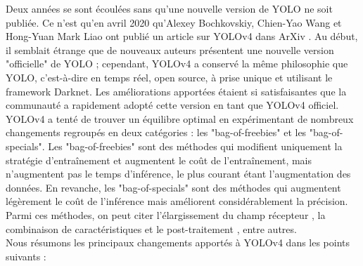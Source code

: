 \documentclass{article}
\begin{document}
Deux années se sont écoulées sans qu'une nouvelle version de YOLO ne soit publiée. Ce n'est qu'en avril 2020 qu'Alexey Bochkovskiy, Chien-Yao Wang et Hong-Yuan Mark Liao ont publié un article sur YOLOv4 dans ArXiv \cite{50}. Au début, il semblait étrange que de nouveaux auteurs présentent une nouvelle version "officielle" de YOLO ; cependant, YOLOv4 a conservé la même philosophie que YOLO, c'est-à-dire en temps réel, open source, à prise unique et utilisant le framework Darknet. Les améliorations apportées étaient si satisfaisantes que la communauté a rapidement adopté cette version en tant que YOLOv4 officiel.
\vspace{.2cm}\\
YOLOv4 a tenté de trouver un équilibre optimal en expérimentant de nombreux changements regroupés en deux catégories : les "bag-of-freebies" et les "bag-of-specials". Les "bag-of-freebies" sont des méthodes qui modifient uniquement la stratégie d'entraînement et augmentent le coût de l'entraînement, mais n'augmentent pas le temps d'inférence, le plus courant étant l'augmentation des données. En revanche, les "bag-of-specials" sont des méthodes qui augmentent légèrement le coût de l'inférence mais améliorent considérablement la précision. Parmi ces méthodes, on peut citer l'élargissement du champ récepteur \cite{48, 51,52}, la combinaison de caractéristiques \cite{53,49,54,55} et le post-traitement \cite{56,40,57,58}, entre autres.
\vspace{.2cm}\\
Nous résumons les principaux changements apportés à YOLOv4 dans les points suivants :
\end{document}
